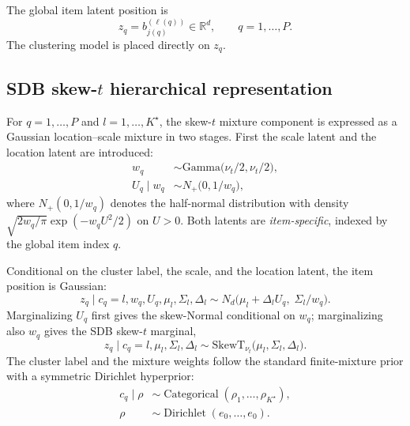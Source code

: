 \documentclass[11pt]{article}
\newcommand{\R}{\mathbb R}
\DeclareMathOperator{\Cat}{Categorical}
\DeclareMathOperator{\Dir}{Dirichlet}
\begin{document}
The global item latent position is
\begin{equation}
    z_q=b_{j(q)}^{(\ell(q))}\in\R^d,
    \qquad q=1,\dots,P.
\end{equation}
The clustering model is placed directly on $z_q$.

\subsection{SDB skew-$t$ hierarchical representation}

For $q=1,\dots,P$ and $l=1,\dots,K^\star$, the skew-$t$ mixture component is
expressed as a Gaussian location--scale mixture in two stages.  First the
scale latent and the location latent are introduced:
\begin{align}
    w_q
    &\sim\mathrm{Gamma}\!\bigl(\nu_t/2,\nu_t/2\bigr),
    \label{eq:w-prior}\\
    U_q\mid w_q
    &\sim N_+\!\bigl(0,1/w_q\bigr),
    \label{eq:U-prior}
\end{align}
where $N_+(0,1/w_q)$ denotes the half-normal distribution with density
$\sqrt{2w_q/\pi}\exp(-w_q U^2/2)$ on $U>0$.  Both latents are
\emph{item-specific}, indexed by the global item index $q$.

Conditional on the cluster label, the scale, and the location latent, the
item position is Gaussian:
\begin{equation}
    z_q\mid c_q=l,w_q,U_q,\mu_l,\Sigma_l,\Delta_l
    \sim
    N_d\!\bigl(\mu_l+\Delta_l U_q,\;\Sigma_l/w_q\bigr).
    \label{eq:z-given-latents}
\end{equation}
Marginalizing $U_q$ first gives the skew-Normal conditional on $w_q$;
marginalizing also $w_q$ gives the SDB skew-$t$ marginal,
\begin{equation}
    z_q\mid c_q=l,\mu_l,\Sigma_l,\Delta_l
    \sim
    \mathrm{SkewT}_{\nu_t}\!\bigl(\mu_l,\Sigma_l,\Delta_l\bigr).
    \label{eq:skewt-marginal}
\end{equation}
The cluster label and the mixture weights follow the standard finite-mixture
prior with a symmetric Dirichlet hyperprior:
\begin{align}
    c_q\mid\rho &\sim\Cat(\rho_1,\dots,\rho_{K^\star}),
    \label{eq:c-prior}\\
    \rho &\sim\Dir(e_0,\dots,e_0).
    \label{eq:rho-prior}
\end{align}
\end{document}
